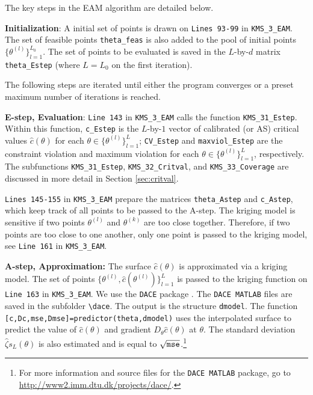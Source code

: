 \documentclass[12pt]{article}
\def\code#1{\texttt{#1}}
\begin{document}
The key steps in the EAM algorithm are detailed below.

\textbf{Initialization}:
A initial set of points is drawn on \code{Lines 93-99} in \code{KMS\_3\_EAM}.  The set of feasible points \code{theta\_feas} is also added to the pool of initial points $\{\theta^{(l)}\}_{l=1}^{L_0}$.  The set of points to be evaluated is saved in the $L$-by-$d$ matrix \code{theta\_Estep} (where $L = L_0$ on the first iteration).

The following steps are iterated until either the program converges or a preset maximum number of iterations is reached.

\textbf{E-step, Evaluation}:
\code{Line 143} in \code{KMS\_3\_EAM} calls the function  \code{KMS\_31\_Estep}. Within this function, \code{c\_Estep} is the $L$-by-$1$ vector of calibrated (or AS) critical values $\hat c(\theta)$ for each $\theta \in \{\theta^{(l)}\}_{l=1}^{L}$;  \code{CV\_Estep} and \code{maxviol\_Estep} are the constraint violation and maximum violation for each $\theta \in \{\theta^{(l)}\}_{l=1}^{L}$, respectively.  The subfunctions \code{KMS\_31\_Estep}, \code{KMS\_32\_Critval}, and  \code{KMS\_33\_Coverage} are discussed in more detail in Section \ref{sec:critval}.

\code{Lines 145-155} in \code{KMS\_3\_EAM} prepare the matrices \code{theta\_Astep} and \code{c\_Astep}, which keep track of all points to be passed to the A-step.  The kriging model is sensitive if two points $\theta^{(l)}$ and $\theta^{(k)}$ are too close together.  Therefore, if two points are too close to one another, only one point is passed to the kriging model, see \code{Line 161} in \code{KMS\_3\_EAM}.

\textbf{A-step, Approximation:}
The surface $\hat c(\theta)$ is approximated via a kriging model.  The set of points $ \{\theta^{(l)},\hat c(\theta^{(l)})\}_{l=1}^{L}$ is passed to the kriging function on \code{Line 163} in \code{KMS\_3\_EAM}.  We use the \code{DACE} package \cite{lophaven2002dace}.  The \code{DACE MATLAB} files are saved in the subfolder \code{\textbackslash dace}.  The output is the structure \code{dmodel}.  The function \code{[c,Dc,mse,Dmse]=predictor(theta,dmodel)} uses the interpolated surface to predict the value of $\hat c(\theta)$ and gradient $D_{\theta} \hat c(\theta)$ at $\theta$.  The standard deviation $\hat \zeta s_L(\theta)$ is also estimated and is equal to $\sqrt{\text{\code{mse}}}$.\footnote{For more information and source files for the \code{DACE MATLAB} package, go to \url{http://www2.imm.dtu.dk/projects/dace/}.}
\end{document}
